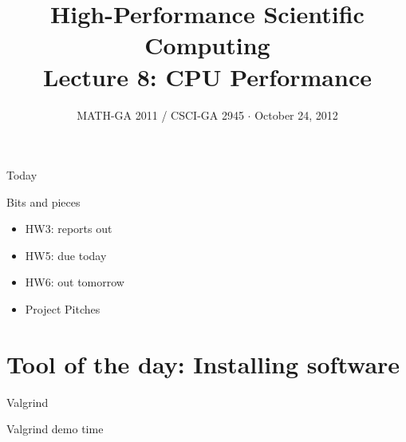 \documentclass[english,compress]{beamer}
\begin{document}

\title{High-Performance Scientific Computing\\Lecture 8: CPU Performance}

\date{MATH-GA 2011 / CSCI-GA 2945 $\cdot$ October 24, 2012}

\frame{\titlepage}

\begin{frame}{Today}
  \tableofcontents[hideallsubsections]
\end{frame}
\begin{frame}{Bits and pieces}
  \begin{itemize}
    \item HW3: reports out
    \item HW5: due today
    \item HW6: out tomorrow
    \item Project Pitches
  \end{itemize}
\end{frame}
\section[Software]{Tool of the day: Installing software}
\begin{frame}{Valgrind}
  \begin{center}
  \Huge Valgrind demo time
  \end{center}
\end{frame}
\end{document}
